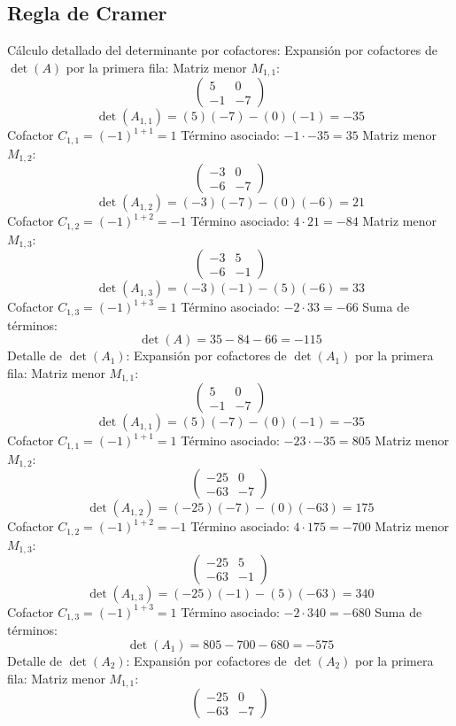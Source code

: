 \documentclass{article}
\begin{document}
\subsection*{Regla de Cramer}
Cálculo detallado del determinante por cofactores:
Expansión por cofactores de $\det(A)$ por la primera fila:
Matriz menor $M_{1,1}$:
\[\begin{pmatrix}5 & 0 \\ -1 & -7\end{pmatrix}\]
\[\det(A_{1,1}) = (5)(-7) - (0)(-1) = -35\]
Cofactor $C_{1,1} = (-1)^{1+1} = 1$
Término asociado: $ -1 \cdot -35 = 35 $
Matriz menor $M_{1,2}$:
\[\begin{pmatrix}-3 & 0 \\ -6 & -7\end{pmatrix}\]
\[\det(A_{1,2}) = (-3)(-7) - (0)(-6) = 21\]
Cofactor $C_{1,2} = (-1)^{1+2} = -1$
Término asociado: $ 4 \cdot 21 = -84 $
Matriz menor $M_{1,3}$:
\[\begin{pmatrix}-3 & 5 \\ -6 & -1\end{pmatrix}\]
\[\det(A_{1,3}) = (-3)(-1) - (5)(-6) = 33\]
Cofactor $C_{1,3} = (-1)^{1+3} = 1$
Término asociado: $ -2 \cdot 33 = -66 $
Suma de términos:
\[\det(A) = 35 - 84 - 66 = -115\]
Detalle de $\det(A_{1})$:
Expansión por cofactores de $\det(A_{1})$ por la primera fila:
Matriz menor $M_{1,1}$:
\[\begin{pmatrix}5 & 0 \\ -1 & -7\end{pmatrix}\]
\[\det(A_{1,1}) = (5)(-7) - (0)(-1) = -35\]
Cofactor $C_{1,1} = (-1)^{1+1} = 1$
Término asociado: $ -23 \cdot -35 = 805 $
Matriz menor $M_{1,2}$:
\[\begin{pmatrix}-25 & 0 \\ -63 & -7\end{pmatrix}\]
\[\det(A_{1,2}) = (-25)(-7) - (0)(-63) = 175\]
Cofactor $C_{1,2} = (-1)^{1+2} = -1$
Término asociado: $ 4 \cdot 175 = -700 $
Matriz menor $M_{1,3}$:
\[\begin{pmatrix}-25 & 5 \\ -63 & -1\end{pmatrix}\]
\[\det(A_{1,3}) = (-25)(-1) - (5)(-63) = 340\]
Cofactor $C_{1,3} = (-1)^{1+3} = 1$
Término asociado: $ -2 \cdot 340 = -680 $
Suma de términos:
\[\det(A_{1}) = 805 - 700 - 680 = -575\]
Detalle de $\det(A_{2})$:
Expansión por cofactores de $\det(A_{2})$ por la primera fila:
Matriz menor $M_{1,1}$:
\[\begin{pmatrix}-25 & 0 \\ -63 & -7\end{pmatrix}\]
\end{document}
